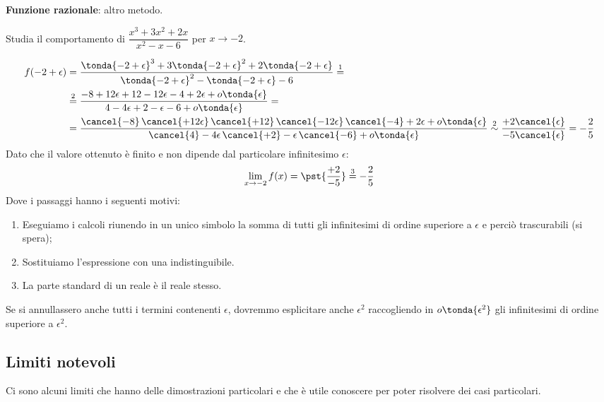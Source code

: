 \begin{esempio}
\textbf{Funzione razionale}: altro metodo.

Studia il comportamento di \(\dfrac{x^3+3x^2+2x}{x^2-x-6}\) per 
\(x \to -2\).

\begin{align*}
f(-2+\epsilon)& = \frac
  {\tonda{-2+\epsilon}^3+3\tonda{-2+\epsilon}^2+2\tonda{-2+\epsilon}}
  {\tonda{-2+\epsilon}^2-\tonda{-2+\epsilon}-6} \stackrel{1}{=}\\ 
  &\stackrel{2}{=}
  \frac{-8+12\epsilon+12-12\epsilon-4+2\epsilon+o\tonda{\epsilon}}
       {4-4\epsilon+2-\epsilon-6+o\tonda{\epsilon}}=\\ 
  &=\frac{\cancel{-8}\,\cancel{+12\epsilon}\,
               \cancel{+12}\,\cancel{-12\epsilon}\,\cancel{-4}+2\epsilon+
               o\tonda{\epsilon}}
              {\cancel{4}-4\epsilon\,\cancel{+2}-\epsilon\,\cancel{-6}+
               o\tonda{\epsilon}}\stackrel{2}{\sim}
    \frac{+2\cancel{\epsilon}}{-5\cancel{\epsilon}} = -\frac{2}{5}
\end{align*}
Dato che il valore ottenuto è finito e non dipende dal particolare 
infinitesimo \(\epsilon\):
\[
\lim_{x \rightarrow -2} f(x) = \pst{\frac{+2}{-5}} \stackrel{3}{=} 
  -\frac{2}{5}
\]
Dove i passaggi hanno i seguenti motivi:
\begin{enumerate} [nosep]
 \item Eseguiamo i calcoli riunendo in un unico simbolo la somma di tutti 
 gli infinitesimi di ordine superiore a \(\epsilon\) e perciò trascurabili 
(si spera);
 \item Sostituiamo l'espressione con una indistinguibile.
 \item La parte standard di un reale è il reale stesso.
\end{enumerate}
\end{esempio}

\begin{osservazione}
Se si annullassero anche tutti i termini contenenti \(\epsilon\), dovremmo 
esplicitare anche \(\epsilon^2\) raccogliendo in \(o\tonda{\epsilon^2}\) 
gli infinitesimi di ordine superiore a \(\epsilon^2\). 
\end{osservazione}

\subsection{Limiti notevoli}
\label{subsec:cont_limiti_notevoli}

Ci sono alcuni limiti che hanno delle dimostrazioni particolari e che è 
utile conoscere per poter risolvere dei casi particolari.

